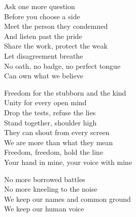 \begin{lyrics}
Ask one more question\\
Before you choose a side\\
Meet the person they condemned\\
And listen past the pride\\
Share the work, protect the weak\\
Let disagreement breathe\\
No oath, no badge, no perfect tongue\\
Can own what we believe

Freedom for the stubborn and the kind\\
Unity for every open mind\\
Drop the tests, refuse the lies\\
Stand together, shoulder high\\
They can shout from every screen\\
We are more than what they mean\\
Freedom, freedom, hold the line\\
Your hand in mine, your voice with mine

No more borrowed battles\\
No more kneeling to the noise\\
We keep our names and common ground\\
We keep our human voice
\end{lyrics}

